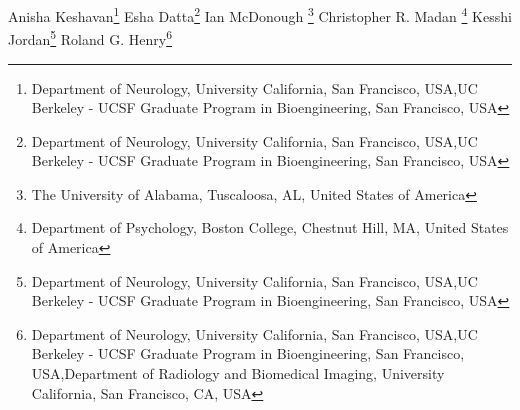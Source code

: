 \iflatexml
Anisha Keshavan\footnote[1,2]{Department of Neurology, University California, San Francisco,  USA,UC Berkeley - UCSF Graduate Program in Bioengineering, San Francisco, USA}
Esha Datta\footnote[1,2]{Department of Neurology, University California, San Francisco,  USA,UC Berkeley - UCSF Graduate Program in Bioengineering, San Francisco, USA}
Ian McDonough \footnote[3] {The University of Alabama, Tuscaloosa, AL, United States of America}
Christopher R. Madan \footnote[4]{Department of Psychology, Boston College, Chestnut Hill, MA, United States of America}
Kesshi Jordan\footnote[1,2]{Department of Neurology, University California, San Francisco,  USA,UC Berkeley - UCSF Graduate Program in Bioengineering, San Francisco, USA}
Roland G. Henry\footnote[1,2,5]{Department of Neurology, University California, San Francisco,  USA,UC Berkeley - UCSF Graduate Program in Bioengineering, San Francisco, USA,Department of Radiology and Biomedical Imaging, University California, San Francisco, CA, USA}

\else %

\author[l1,l2]{Anisha Keshavan}

\author[l1,l2]{Esha Datta}

\author[3]{Ian McDonough}

\author[4]{Christopher R Madan}

\author[l1,l2]{Kesshi Jordan}

\author[l1,l2,5]{Roland G. Henry}

\address[l1]{Department of Neurology, University California, San Francisco,  USA}
\address[l2]{UC Berkeley - UCSF Graduate Program in Bioengineering, San Francisco, USA}
\address[3]{The University of Alabama, Tuscaloosa, AL, United States of America}
\address[4]{Boston College, Chestnut Hill, MA, United States of America}
\address[5]{Department of Radiology and Biomedical Imaging, University California, San Francisco, CA, USA}

\fi